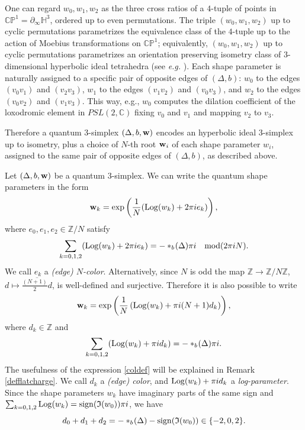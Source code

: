\documentclass[11pt]{amsart}
\newcommand{\mc}{\mathbb{C}}
\newcommand{\mz}{\mathbb{Z}}
\newcommand{\mh}{\mathbb{H}}
\newcommand{\bw}{{\bf w}}
\newcommand{\Log}{{\rm Log}}
\begin{document}
One can regard $w_0,w_1,w_2$ as the three cross ratios of a $4$-tuple of points in $\mc\mathbb{P}^1=\partial_\infty \mh^3$, ordered up to even permutations. The triple $(w_0,w_1,w_2)$ up to cyclic permutations parametrizes the equivalence class of the $4$-tuple up to the action of Moebius transformations on $\mc\mathbb{P}^1$; equivalently, $(w_0,w_1,w_2)$ up to cyclic permutations parametrizes an orientation preserving isometry class of $3$-dimensional hyperbolic ideal tetrahedra (see {\it e.g.} \cite[Chapter E.6-i]{BP}). Each shape parameter is naturally assigned to a specific pair of opposite edges of $(\Delta,b)$: $w_0$ to the edges $(v_0v_1)$ and $(v_2v_3)$, $w_1$ to the edges $(v_1v_2)$ and $(v_0v_3)$, and $w_2$ to the edges $(v_0v_2)$ and $(v_1v_3)$. This way, e.g., $w_0$ computes the dilation coefficient of the loxodromic element in $PSL(2,\mc)$ fixing $v_0$ and $v_1$ and mapping $v_2$ to $v_3$.

Therefore a quantum $3$-simplex $(\Delta,b,\bw)$ encodes an hyperbolic ideal $3$-simplex up to isometry, plus a choice of $N$-th root $\bw_i$ of each shape parameter $w_i$, assigned to the same pair of opposite edges of $(\Delta,b)$, as described above. 
\medskip

Let $(\Delta,b,\bw)$ be a quantum $3$-simplex. We can write the quantum shape parameters in the form  
\begin{equation}\label{ecoldef}\bw_k = \exp\left(\frac{1}{N}(\Log(w_k) +2\pi i e_k)\right),
\end{equation}
where $e_0,e_1,e_2\in \mz/N$ satisfy
\begin{equation}\label{etetcol}
\sum_{k=0,1,2} (\Log(w_k) +2\pi i e_k) = -*_b\! (\Delta)\pi i\quad {\rm mod}(2\pi i N).
\end{equation}
We call $e_k$ a {\it (edge) $N$-color}. Alternatively, since $N$ is odd the map $\mz \rightarrow \mz/N\mz$, $d\mapsto \textstyle \overline{\frac{(N+1)}{2} d}$, is well-defined and surjective. Therefore it is also possible to write
\begin{equation}\label{coldef}\bw_k = \exp\left(\frac{1}{N}\left(\Log(w_k) +\pi i (N+1)d_k\right)\right),
\end{equation}
where $d_k \in \mz$ and 
\begin{equation}\label{tetcol}
\sum_{k=0,1,2} (\Log(w_k) +\pi i d_k) = -*_b\! (\Delta)\pi i.
\end{equation}
The usefulness of the expression \eqref{coldef} will be explained in Remark \ref{defflatcharge}. We call $d_k$ a {\it (edge) color}, and $\Log(w_k) +\pi i d_k$ a {\it log-parameter}. Since the shape parameters $w_k$ have imaginary parts of the same sign and $\textstyle \sum_{k=0,1,2} \Log(w_k) = {\rm sign}(\mathfrak{I}(w_0))\pi i$, we have
\begin{equation}\label{sumdeven}
d_0+d_1+d_2 = -*_b\! (\Delta)- {\rm sign}(\mathfrak{I}(w_0))\in \{-2,0,2\}.
\end{equation} 
\end{document}
